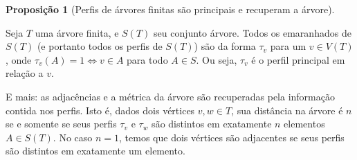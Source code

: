 \documentclass[11pt]{article}
\newcommand{\pulinho}{\vspace{.5cm}}
\theoremstyle{definition}
\theoremstyle{definition}
\theoremstyle{definition}
\newtheorem{prop}{Proposição}
\newenvironment{proposicao}{
\definecolor{shadecolor}{HTML}{FFDBDF}
\begin{shaded}
\begin{prop}
}
{
\end{prop}
\end{shaded}
}
\theoremstyle{definition}
\theoremstyle{definition}
\theoremstyle{definition}
\theoremstyle{definition}
\theoremstyle{definition}
\theoremstyle{definition}
\theoremstyle{definition}
\theoremstyle{definition}
\theoremstyle{definition}
\theoremstyle{definition}
\theoremstyle{definition}
\begin{document}
\begin{proposicao}[Perfis de árvores finitas são principais e recuperam a árvore]
  \label{perfis-arvore-finito}
  
  Seja $T$ uma árvore finita, e $S(T)$ seu conjunto árvore. Todos os emaranhados de $S(T)$ (e portanto todos os perfis de $S(T)$) são da forma $\tau_v$ para um $v \in V(T)$, onde $\tau_v(A) = 1 \Leftrightarrow v \in A$ para todo $A \in S$. Ou seja, $\tau_v$ é o perfil principal em relação a $v$. 

  \pulinho

  E mais: as adjacências e a métrica da árvore são recuperadas pela informação contida nos perfis. Isto é, dados dois vértices $v,w \in T$, sua distância na árvore é $n$ se e somente se seus perfis $\tau_v$ e $\tau_w$ são distintos em exatamente $n$ elementos $A \in S(T)$. No caso $n = 1$, temos que dois vértices são adjacentes se seus perfis são distintos em exatamente um elemento.
\end{proposicao}
\end{document}
